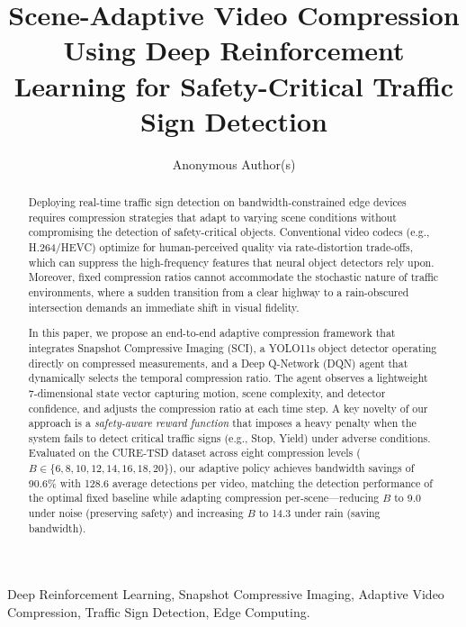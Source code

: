 \documentclass[10pt,journal]{IEEEtran}
\begin{document}
\title{Scene-Adaptive Video Compression Using Deep Reinforcement Learning for Safety-Critical Traffic Sign Detection}
\author{Anonymous Author(s)}

\maketitle


\begin{abstract}
Deploying real-time traffic sign detection on bandwidth-constrained edge devices requires compression strategies that adapt to varying scene conditions without compromising the detection of safety-critical objects. Conventional video codecs (e.g., H.264/HEVC) optimize for human-perceived quality via rate-distortion trade-offs, which can suppress the high-frequency features that neural object detectors rely upon. Moreover, fixed compression ratios cannot accommodate the stochastic nature of traffic environments, where a sudden transition from a clear highway to a rain-obscured intersection demands an immediate shift in visual fidelity.

In this paper, we propose an end-to-end adaptive compression framework that integrates Snapshot Compressive Imaging (SCI), a YOLO11s object detector operating directly on compressed measurements, and a Deep Q-Network (DQN) agent that dynamically selects the temporal compression ratio. The agent observes a lightweight 7-dimensional state vector capturing motion, scene complexity, and detector confidence, and adjusts the compression ratio at each time step. A key novelty of our approach is a \emph{safety-aware reward function} that imposes a heavy penalty when the system fails to detect critical traffic signs (e.g., Stop, Yield) under adverse conditions. Evaluated on the CURE-TSD dataset across eight compression levels ($B \in \{6,8,10,12,14,16,18,20\}$), our adaptive policy achieves bandwidth savings of 90.6\% with 128.6 average detections per video, matching the detection performance of the optimal fixed baseline while adapting compression per-scene---reducing $B$ to 9.0 under noise (preserving safety) and increasing $B$ to 14.3 under rain (saving bandwidth).

\end{abstract}

\begin{IEEEkeywords}
Deep Reinforcement Learning, Snapshot Compressive Imaging, Adaptive Video Compression, Traffic Sign Detection, Edge Computing.
\end{IEEEkeywords}
\end{document}
